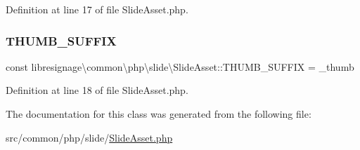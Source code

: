 Definition at line 17 of file Slide\+Asset.\+php.

\mbox{\label{classlibresignage_1_1common_1_1php_1_1slide_1_1SlideAsset_a05800f5eb93ad654211eea6e34db568e}} 
\subsubsection{\texorpdfstring{T\+H\+U\+M\+B\+\_\+\+S\+U\+F\+F\+IX}{THUMB\_SUFFIX}}
{\footnotesize\ttfamily const libresignage\textbackslash{}common\textbackslash{}php\textbackslash{}slide\textbackslash{}\+Slide\+Asset\+::\+T\+H\+U\+M\+B\+\_\+\+S\+U\+F\+F\+IX = \textquotesingle{}\+\_\+thumb\textquotesingle{}}



Definition at line 18 of file Slide\+Asset.\+php.



The documentation for this class was generated from the following file\+:\begin{DoxyCompactItemize}
\item 
src/common/php/slide/\hyperlink{SlideAsset_8php}{Slide\+Asset.\+php}\end{DoxyCompactItemize}
